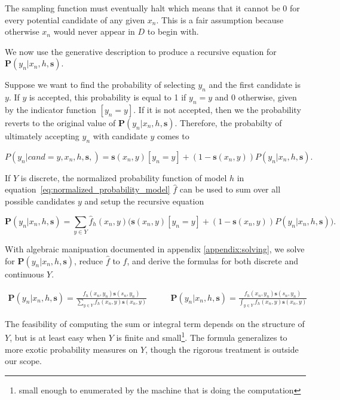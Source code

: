 \documentclass[twoside]{article}
\begin{document}
The sampling function must eventually halt which means that it cannot be 0 for every potential candidate of any given \(x_n\). This is a fair assumption because otherwise \(x_n\) would never appear in \(D\) to begin with.

We now use the generative description to produce a recursive equation for \(\mathbf{P}(y_n|x_n,h,\mathbf{s})\).

Suppose we want to find the probability of selecting \(y_n\) and the first candidate is \(y\). If \(y\) is accepted, this probability is equal to 1 if \(y_n = y\) and 0 otherwise, given by the indicator function \(\left [y_n = y\right ]\). If it is not accepted, then we the probability reverts to the original value of \(\mathbf{P}(y_n|x_n,h,\mathbf{s})\). Therefore, the probabilty of ultimately accepting \(y_n\) with candidate \(y\) comes to

\[P(y_n|cand=y,x_n,h,\mathbf{s},)=\mathbf{s}(x_n,y)\left [y_n = y\right ] + (1-\mathbf{s}(x_n,y))P(y_n|x_n,h,\mathbf{s}).\]

If \(Y\) is discrete, the normalized probability function of model \(h\) in equation~\eqref{eq:normalized_probability_model} \(\hat{f}\) can be used to sum over all possible candidates \(y\) and setup the recursive equation

\begin{equation}
\label{eq:bias_corrected_setup}
\mathbf{P}(y_n|x_n,h,\mathbf{s})=\sum_{y \in Y}\hat{f}_h(x_n,y)\big(\mathbf{s}(x_n,y)\left [y_n = y\right ] + (1-\mathbf{s}(x_n,y))P(y_n|x_n,h,\mathbf{s})\big).
\end{equation}

With algebraic manipuation documented in appendix \ref{appendix:solving}, we solve for \(\mathbf{P}(y_n|x_n,h,\mathbf{s})\), reduce \(\hat{f}\) to \(f\), and derive the formulas for both discrete and continuous \(Y\).

\begin{align}
\label{eq:bias_corrected_prob}
\mathbf{P}(y_n|x_n,h,\mathbf{s})=\frac{f_h(x_n,y_n)\mathbf{s}(s_n,y_n)}{\sum_{y \in Y}f_h(x_n,y)\mathbf{s}(x_n,y)} &
\qquad\mathbf{P}(y_n|x_n,h,\mathbf{s})=\frac{f_h(x_n,y_n)\mathbf{s}(s_n,y_n)}{\int_{y \in Y}f_h(x_n,y)\mathbf{s}(x_n,y)}
\end{align}

The feasibility of computing the sum or integral term depends on the structure of \(Y\), but is at least easy when \(Y\) is finite and small\footnote{small enough to enumerated by the machine that is doing the computation}. The formula generalizes to more exotic probability measures on \(Y\), though the rigorous treatment is outside our scope.
\end{document}
